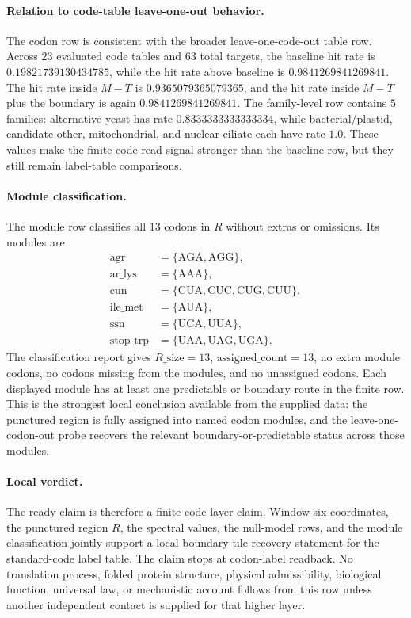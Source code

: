 \paragraph{Relation to code-table leave-one-out behavior.}
The codon row is consistent with the broader leave-one-code-out table row.  Across $23$ evaluated code tables and $63$ total targets, the baseline hit rate is $0.19821739130434785$, while the hit rate above baseline is $0.9841269841269841$.  The hit rate inside $M-T$ is $0.9365079365079365$, and the hit rate inside $M-T$ plus the boundary is again $0.9841269841269841$.  The family-level row contains $5$ families: alternative yeast has rate $0.8333333333333334$, while bacterial/plastid, candidate other, mitochondrial, and nuclear ciliate each have rate $1.0$.  These values make the finite code-read signal stronger than the baseline row, but they still remain label-table comparisons.

\paragraph{Module classification.}
The module row classifies all $13$ codons in $R$ without extras or omissions.  Its modules are
$$
\begin{aligned}
\mathrm{agr}&=\{\mathrm{AGA},\mathrm{AGG}\},\\
\mathrm{ar\_lys}&=\{\mathrm{AAA}\},\\
\mathrm{cun}&=\{\mathrm{CUA},\mathrm{CUC},\mathrm{CUG},\mathrm{CUU}\},\\
\mathrm{ile\_met}&=\{\mathrm{AUA}\},\\
\mathrm{ssn}&=\{\mathrm{UCA},\mathrm{UUA}\},\\
\mathrm{stop\_trp}&=\{\mathrm{UAA},\mathrm{UAG},\mathrm{UGA}\}.
\end{aligned}
$$
The classification report gives $R\_\mathrm{size}=13$, $\mathrm{assigned\_count}=13$, no extra module codons, no codons missing from the modules, and no unassigned codons.  Each displayed module has at least one predictable or boundary route in the finite row.  This is the strongest local conclusion available from the supplied data: the punctured region is fully assigned into named codon modules, and the leave-one-codon-out probe recovers the relevant boundary-or-predictable status across those modules.

\paragraph{Local verdict.}
The ready claim is therefore a finite code-layer claim.  Window-six coordinates, the punctured region $R$, the spectral values, the null-model rows, and the module classification jointly support a local boundary-tile recovery statement for the standard-code label table.  The claim stops at codon-label readback.  No translation process, folded protein structure, physical admissibility, biological function, universal law, or mechanistic account follows from this row unless another independent contact is supplied for that higher layer.